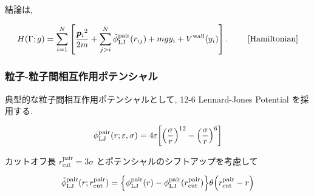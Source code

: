 \documentclass[dvipdfmx]{jsarticle}
\numberwithin{equation}{subsection}
\begin{document}
結論は, 

\begin{align}
  H(\Gamma; g)
  &= \sum_{i=1}^{N}
  \left[
    \frac{{\bm{p}_i}^2}{2m} 
    + \sum_{j > i}^{N}
      \tilde{\phi}_{\text{LJ}}^{\text{pair}}(r_{ij})
    + mgy_i
    + V^{\text{wall}} (y_i)
  \right] . \ \tag*{\eqref{Hamiltonian}} \\
\end{align}

\subsubsection{粒子-粒子間相互作用ポテンシャル}

典型的な粒子間相互作用ポテンシャルとして, 12-6 Lennard-Jones Potential を採用する.

\begin{align}
  \phi_{\text{LJ}}^{\text{pair}}(r; \varepsilon, \sigma) = 4\varepsilon \qty[\qty(\frac{\sigma}{r})^{12} - \qty(\frac{\sigma}{r})^{6} ] \\
\end{align}

カットオフ長 $r_{\text{cut}}^{\text{pair}}=3\sigma$ とポテンシャルのシフトアップを考慮して

\begin{align}
  \tilde{\phi}_{\text{LJ}}^{\text{pair}}(r;r_{\text{cut}}^{\text{pair}}) = \qty{\phi_{\text{LJ}}^{\text{pair}}(r) - \phi_{\text{LJ}}^{\text{pair}}(r_{\text{cut}}^{\text{pair}})}\theta \qty(r_{\text{cut}}^{\text{pair}}-r) \\
\end{align}


\end{document}
